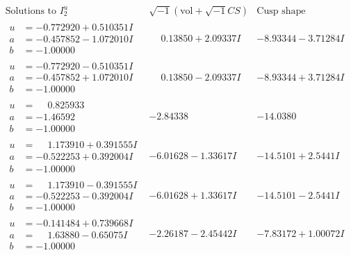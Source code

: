 \documentclass[1p]{elsarticle_modified}
\theoremstyle{definition}
\newcommand{\I}{\sqrt{-1}}
\begin{document}
$$\begin{array}{c|c|c}  
\text{Solutions to }I^u_{2}& \I (\text{vol} + \sqrt{-1}CS) & \text{Cusp shape}\\
 \hline 
\begin{aligned}
u &= -0.772920 + 0.510351 I \\
a &= -0.457852 - 1.072010 I \\
b &= -1.00000\phantom{ +0.000000I}\end{aligned}
 & \phantom{-}0.13850 + 2.09337 I & -8.93344 - 3.71284 I \\ \hline\begin{aligned}
u &= -0.772920 - 0.510351 I \\
a &= -0.457852 + 1.072010 I \\
b &= -1.00000\phantom{ +0.000000I}\end{aligned}
 & \phantom{-}0.13850 - 2.09337 I & -8.93344 + 3.71284 I \\ \hline\begin{aligned}
u &= \phantom{-}0.825933\phantom{ +0.000000I} \\
a &= -1.46592\phantom{ +0.000000I} \\
b &= -1.00000\phantom{ +0.000000I}\end{aligned}
 & -2.84338\phantom{ +0.000000I} & -14.0380\phantom{ +0.000000I} \\ \hline\begin{aligned}
u &= \phantom{-}1.173910 + 0.391555 I \\
a &= -0.522253 + 0.392004 I \\
b &= -1.00000\phantom{ +0.000000I}\end{aligned}
 & -6.01628 - 1.33617 I & -14.5101 + 2.5441 I \\ \hline\begin{aligned}
u &= \phantom{-}1.173910 - 0.391555 I \\
a &= -0.522253 - 0.392004 I \\
b &= -1.00000\phantom{ +0.000000I}\end{aligned}
 & -6.01628 + 1.33617 I & -14.5101 - 2.5441 I \\ \hline\begin{aligned}
u &= -0.141484 + 0.739668 I \\
a &= \phantom{-}1.63880 - 0.65075 I \\
b &= -1.00000\phantom{ +0.000000I}\end{aligned}
 & -2.26187 - 2.45442 I & -7.83172 + 1.00072 I \\ \hline\begin{aligned}

\end{aligned}
\end{array}$$
\end{document}
